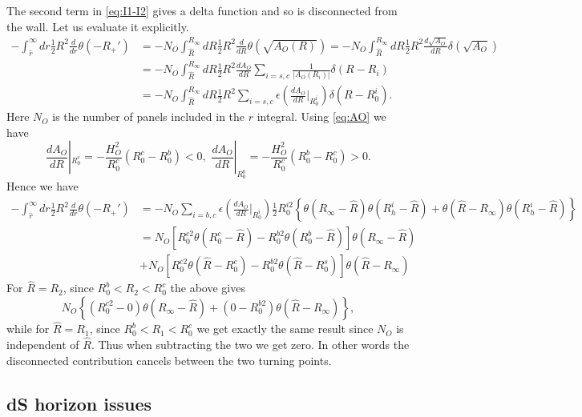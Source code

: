 \documentclass[a4paper,11pt]{article}
\numberwithin{equation}{section}
\numberwithin{equation}{section}
\begin{document}
The second term in \eqref{eq:I1-I2} gives a delta function and so
is disconnected from the wall. Let us evaluate it explicitly. 
\begin{align}
-\int_{\hat{r}}^{\infty}dr\frac{1}{2}R^{2}\frac{d}{dr}\theta(-R_{+}') & =-N_{O}\int_{\hat{R}}^{R_{\infty}}dR\frac{1}{2}R^{2}\frac{d}{dR}\theta\left(\sqrt{A_{O}\left(R\right)}\right)=-N_{O}\int_{\hat{R}}^{R_{\infty}}dR\frac{1}{2}R^{2}\frac{d\sqrt{A_{O}}}{dR}\delta\left(\sqrt{A_{O}}\right)\nonumber \\
 & =-N_{O}\int_{\hat{R}}^{R_{\infty}}dR\frac{1}{2}R^{2}\frac{dA_{O}}{dR}\sum_{i=s,c}\frac{1}{|A_{O}(R_{i})|}\delta\left(R-R_{i}\right)\nonumber \\
 & =-N_{O}\int_{\hat{R}}^{R_{\infty}}dR\frac{1}{2}R^{2}\sum_{i=s,c}\epsilon\left(\frac{dA_{O}}{dR}|_{R_0^{i}}\right)\delta\left(R-R_0^{i}\right).\label{eq:discO}
\end{align}
Here $N_{O}$ is the number of panels included in the $r$ integral.
Using \eqref{eq:AO} we have
\[
\frac{dA_{O}}{dR}|_{R_0^{c}}=-\frac{H_{O}^{2}}{R_0^{c}}\left(R_0^{c}-R_0^{b}\right)<0,\,\,\frac{dA_{O}}{dR}|_{R_0^{b}}=-\frac{H_{O}^{2}}{R_0^{c}}\left(R_0^{b}-R_0^{c}\right)>0.
\]
Hence we have
\begin{align*}
-\int_{\hat{r}}^{\infty}dr\frac{1}{2}R^{2}\frac{d}{dr}\theta(-R_{+}') & =-N_{O}\sum_{i=b,c}\epsilon\left(\frac{dA_{O}}{dR}|_{R_0^{i}}\right)\frac{1}{2}R_0^{i2}\left\{ \theta\left(R_{\infty}-\hat{R}\right)\theta\left(R_{h}^{i}-\hat{R}\right)+\theta\left(\hat{R}-R_{\infty}\right)\theta\left(R_{h}^{i}-\hat{R}\right)\right\} \\
 & =N_{O}\left[R_0^{c2}\theta\left(R_0^{c}-\hat{R}\right)-R_0^{b2}\theta\left(R_0^{b}-\hat{R}\right)\right]\theta\left(R_{\infty}-\hat{R}\right)\\
 & +N_{O}\left[R_0^{c2}\theta\left(\hat{R}-R_0^{c}\right)-R_0^{b2}\theta\left(\hat{R}-R_0^{s}\right)\right]\theta\left(\hat{R}-R_{\infty}\right)
\end{align*}
For $\hat{R}=R_{2}$, since $R_0^{b}<R_{2}<R_0^{c}$ the above
gives
\[
N_{O}\left\{ \left(R_0^{c2}-0\right)\theta\left(R_{\infty}-\hat{R}\right)+\left(0-R_0^{b2}\right)\theta\left(\hat{R}-R_{\infty}\right)\right\} ,
\]
while for $\hat{R}=R_{1}$, since $R_0^{b}<R_{1}<R_0^{c}$ we
get exactly the same result since $N_{O}$ is independent of $\hat{R}$.
Thus when subtracting the two we get zero. In other words the disconnected
contribution cancels between the two turning points.



\subsection{dS horizon issues}
\end{document}
